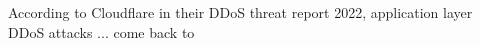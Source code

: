 According to Cloudflare in their DDoS threat report 2022, application layer DDoS attacks ... come back to 





